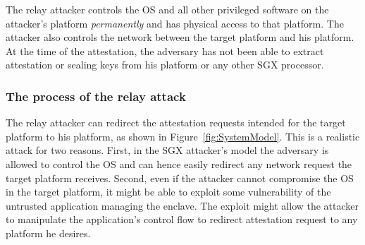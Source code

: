 The relay attacker controls the OS and all other privileged software on the attacker's platform \emph{permanently} and has physical access to that platform. The attacker also controls the network between the target platform and his platform. At the time of the attestation, the adversary has not been able to extract attestation or sealing keys from his platform or any other SGX processor.


\subsubsection{The process of the relay attack} The relay attacker can redirect the attestation requests intended for the target platform to his platform, as shown in Figure~\ref{fig:SystemModel}. This is a realistic attack for two reasons. First, in the SGX attacker's model the adversary is allowed to control the OS and can hence easily redirect any network request the target platform receives. Second, even if the attacker cannot compromise the OS in the target platform, it might be able to exploit some vulnerability of the untrusted application managing the enclave. The exploit might allow the attacker to manipulate the application's control flow to redirect attestation request to any platform he desires.




